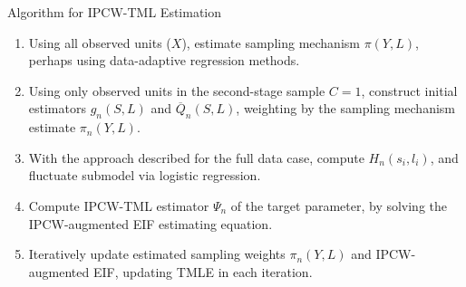 \documentclass{beamer}
\begin{document}
\begin{frame}[c]{Algorithm for IPCW-TML Estimation}

\begin{center}
\begin{enumerate}\label{ipcwtmle_algo}
  \itemsep8pt
  \item Using all observed units ($X$), estimate sampling mechanism
    $\pi(Y, L)$, perhaps using data-adaptive regression methods.
  \item Using only observed units in the second-stage sample $C = 1$,
    construct initial estimators $g_n(S,L)$ and $\overline{Q}_n(S,L)$,
    weighting by the sampling mechanism estimate $\pi_n(Y,L)$.
  \item With the approach described for the full data case, compute
    $H_n(s_i,l_i)$, and fluctuate submodel via logistic regression.
  \item Compute IPCW-TML estimator $\Psi_n$ of the target parameter, by solving
    the IPCW-augmented EIF estimating equation.
  \item Iteratively update estimated sampling weights $\pi_n(Y,L)$ and
    IPCW-augmented EIF, updating TMLE in each iteration.
\end{enumerate}
\end{center}


\end{frame}


\setbeamercovered{}
\beamerdefaultoverlayspecification{}

\begin{frame}[c,allowframebreaks]{}

\tiny



\end{frame}
\end{document}
